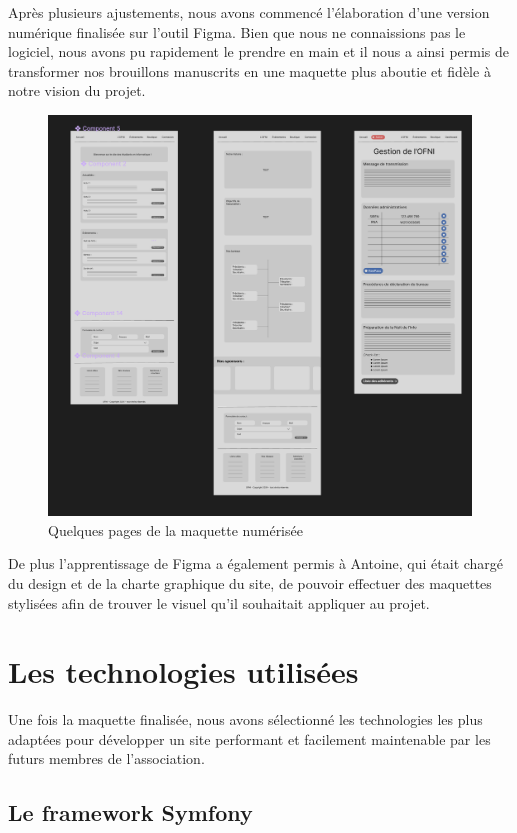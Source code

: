 Après plusieurs ajustements, nous 
avons commencé l'élaboration d'une version numérique finalisée sur l'outil Figma.
Bien que nous ne connaissions pas le logiciel, nous avons pu rapidement le prendre en main et il nous a ainsi permis de transformer nos brouillons manuscrits en une maquette plus aboutie et fidèle à notre vision du projet.

\begin{figure}[H]
    \centering
    \includegraphics[scale=0.4]{assets/pictures/figma.png}
    \caption{Quelques pages de la maquette numérisée}
    \label{fig:maquette-figma}
\end{figure}

De plus l'apprentissage de Figma a également permis à Antoine, qui était chargé du design et de la charte graphique du site, de pouvoir effectuer des maquettes stylisées afin de trouver le visuel qu'il souhaitait appliquer au projet.

\section{Les technologies utilisées}

Une fois la maquette finalisée, nous avons sélectionné les technologies les plus adaptées pour développer un site performant et facilement maintenable par les futurs membres de l’association.

\subsection{Le framework Symfony}

